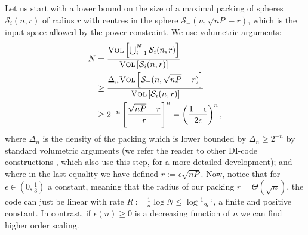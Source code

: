 \documentclass[10pt,conference]{IEEEtran}
\newcommand{\1}{\mathds{1}}
\newcommand{\cS}{\mathcal{S}}
\newcommand{\aw}[1]{{\color{blue}#1}}
\begin{document}
Let us start with a lower bound on the size of a maximal packing of spheres $\cS_i(n,r)$ of radius $r$ with centres in the sphere $\cS_-(n,\sqrt{nP}-r)$, which is the input space allowed by the power constraint. We use volumetric arguments:
\begin{equation}
\label{eq:code_size}
\begin{split}
N&=\frac{\textsc{Vol}\left[\bigcup_{i=1}^N\cS_i(n,r)\right]}{\textsc{Vol}\left[\cS_i(n,r)\right]}\\
&\geq\frac{\Delta_n \textsc{Vol}\left[\cS_-(n,\sqrt{nP}-r)\right]}{\textsc{Vol}\left[\cS_i(n,r)\right]}\\
&\geq2^{-n}\left[\frac{\sqrt{nP}-r}{r}\right]^n=\left(\frac{1-\epsilon}{2\epsilon}\right)^n,
\end{split}
\end{equation}
where $\Delta_n$ is the density of the packing which is lower bounded by $\Delta_n\geq2^{-n}$ by standard volumetric arguments \cite{CS:Packings_lattices} (we refer the reader to other DI-code constructions \cite{SPBD:DI_power,DI-fading,CDBW:DI_classical}, which also use this step, for a more detailed development); and where in the last equality we have defined $r:=\epsilon\sqrt{nP}$. Now, notice that for $\epsilon\in(0,\frac13)$ a constant, meaning that the radius of our packing $r=\Theta(\sqrt{n})$, the code can just be linear with rate $R:=\frac1n\log N\leq \log\frac{1-\epsilon}{2\epsilon}$, a finite and positive constant. In contrast, if $\epsilon(n)\geq 0$ is a decreasing function of $n$ we can find higher order scaling.

\end{document}
